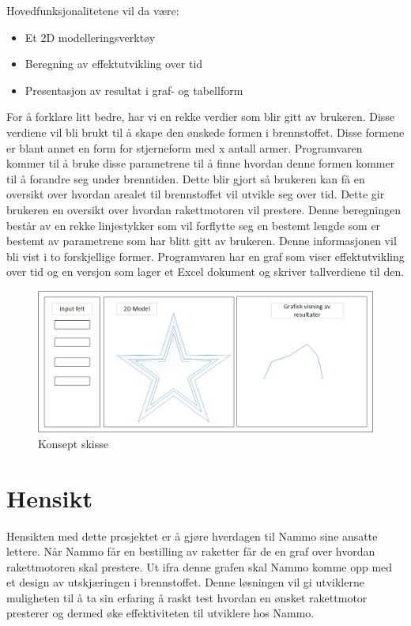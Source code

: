 Hovedfunksjonalitetene vil da være:
\begin{itemize}
    \item  Et 2D modelleringsverktøy
    \item Beregning av effektutvikling over tid
    \item  Presentasjon av resultat i graf- og tabellform
\end{itemize}
For å forklare litt bedre, har vi en rekke verdier som blir gitt av brukeren. Disse verdiene vil bli brukt til å skape den ønskede formen i brennstoffet. Disse formene er blant annet en form for stjerneform med  x antall armer. Programvaren kommer til å bruke disse parametrene til å finne hvordan denne formen kommer til å forandre seg under brenntiden. Dette blir gjort så brukeren kan få en oversikt over hvordan arealet til brennstoffet vil utvikle seg over tid. Dette gir brukeren en oversikt over hvordan rakettmotoren vil prestere. Denne beregningen består av en rekke linjestykker som vil forflytte seg en bestemt lengde som er bestemt av parametrene som har blitt gitt av brukeren. Denne informasjonen vil bli vist i to forskjellige former. Programvaren har en graf som viser effektutvikling over tid og en versjon som lager et Excel dokument og skriver tallverdiene til den.

\begin{figure}[h]
    \centering
    \includegraphics[width=\textwidth]{model}
    \caption{Konsept skisse}
    \label{fig:my_label}
\end{figure}

\section{Hensikt}
Hensikten med dette prosjektet er å gjøre hverdagen til Nammo sine ansatte lettere. Når Nammo får en bestilling av raketter får de en graf over hvordan rakettmotoren skal prestere. Ut ifra denne grafen skal Nammo komme opp med et design av utskjæringen i brennstoffet. Denne løsningen vil gi utviklerne muligheten til å ta sin erfaring å raskt test hvordan en ønsket rakettmotor presterer og dermed øke effektiviteten til utviklere hos Nammo.

